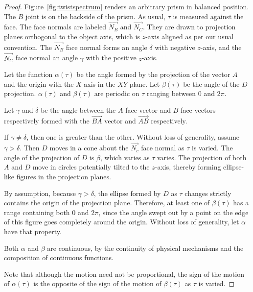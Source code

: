 \documentclass[mathematics,article,submit,pdftex,moreauthors]{Definitions/mdpi}
\begin{document}
\begin{proof}
  Figure~\ref{fig:twistspectrum} renders an arbitrary
  prism in balanced position. The $B$ joint is on the backside of the
  prism. As usual, $\tau$ is measured against the
  face. The face normals are labeled $\overrightarrow{N_B}$ and $\overrightarrow{N_C}$.
  They are drawn
  to projection planes orthogonal to the object axis, which is $z$-axis
  aligned as per our usual convention. The $\overrightarrow{N_B}$ face normal forms
  an angle $\delta$ with negative $z$-axis, and the $\overrightarrow{N_C}$ face normal
  an angle $\gamma$ with the positive $z$-axis.

  Let the function $\alpha(\tau)$ be the angle formed by the
  projection of the vector $A$ and the origin with the $X$ axis in the $XY$-plane.
  Let $\beta(\tau)$ be the angle of the $D$ projection. $\alpha(\tau)$
  and $\beta(\tau)$ are periodic on $\tau$ ranging between $0$ and
  $2\pi$.

    Let $\gamma$ and $\delta$ be the angle between the $A$ face-vector and
    $B$ face-vectors respectively formed with the
    $\overrightarrow{BA}$ vector and $\overrightarrow{AB}$ respectively.

    If $\gamma \neq \delta$, then one is greater than the other.
    Without loss of generality, assume $\gamma > \delta$.
    Then $D$ moves in a cone
    about the $\overrightarrow{N_c}$ face normal as $\tau$ is varied. The
    angle of the projection of $D$ is $\beta$, which varies as $\tau$
    varies.
    The projection of both $A$ and $D$ move in circles
    potentially tilted to the $z$-axis, thereby
    forming ellipse-like figures in the projection planes.

    By assumption, because $\gamma > \delta$, the
    ellipse formed by $D$ as $\tau$ changes
    strictly contains the origin of the projection plane.
    Therefore, at least one of $\beta(\tau)$  has a range
    containing both $0$ and $2\pi$, since the angle swept out by
    a point on the edge of this figure goes completely around the origin.
    Without loss of generality, let $\alpha$ have that property.

    Both $\alpha$ and $\beta$ are continuous, by the continuity of
    physical mechanisms and the composition of continuous functions.

    Note that although the motion need not be proportional, the sign
    of the motion of $\alpha(\tau)$ is the opposite of the sign of the
    motion of $\beta(\tau)$ as $\tau$ is varied.


\end{proof}
\end{document}
